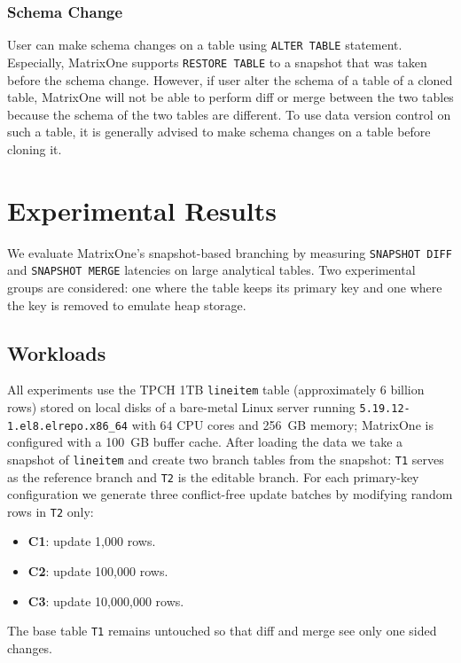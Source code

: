 \documentclass[sigconf,nonacm]{acmart} %
\begin{document}
\subsubsection{Schema Change}
User can make schema changes on a table using \texttt{ALTER TABLE} 
statement.  Especially, MatrixOne supports \texttt{RESTORE TABLE} 
to a snapshot that was taken before the schema change.  However, 
if user alter the schema of a table of a cloned table, MatrixOne
will not be able to perform diff or merge between the two tables
because the schema of the two tables are different.  To use data
version control on such a table, it is generally advised to make 
schema changes on a table before cloning it. 


\section{Experimental Results}
We evaluate MatrixOne's snapshot-based branching by measuring
\texttt{SNAPSHOT DIFF} and \texttt{SNAPSHOT MERGE} latencies on large
analytical tables.  Two experimental groups are considered: one where
the table keeps its primary key and one where the key is removed to
emulate heap storage.

\subsection{Workloads}
All experiments use the TPCH 1TB \texttt{lineitem} table (approximately
6 billion rows) stored on local disks of a bare-metal Linux server
running \texttt{5.19.12-1.el8.elrepo.x86\_64} with 64 CPU cores and
256~GB memory; MatrixOne is configured with a 100~GB buffer cache.
After loading the data we take a snapshot of \texttt{lineitem} and
create two branch tables from the snapshot: \texttt{T1} serves as the
reference branch and \texttt{T2} is the editable branch.  For each
primary-key configuration we generate three conflict-free update batches
by
modifying random rows in \texttt{T2} only:

\begin{itemize}
\item \textbf{C1}: update 1{,}000 rows.
\item \textbf{C2}: update 100{,}000 rows.
\item \textbf{C3}: update 10{,}000{,}000 rows.
\end{itemize}

The base table \texttt{T1} remains untouched so that diff and merge see
only one sided changes.
\end{document}
